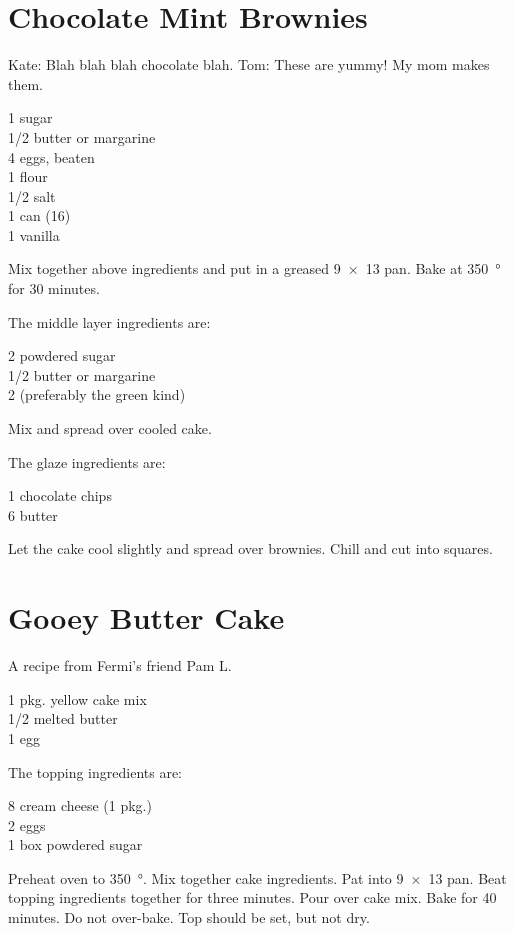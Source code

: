 \section{Chocolate Mint Brownies}

\begin{open}
  Kate: Blah blah blah chocolate blah.  Tom: These are yummy!  My mom makes
  them.
\end{open}
\begin{ingredients}
  \SI{1}{\cup} sugar\\
  \SI{1/2}{\cup} butter or margarine\\
  4 eggs, beaten\\
  \SI{1}{\cup} flour\\
  \SI{1/2}{\teaspoon} salt\\
  1 can  (\SI{16}{\ounce})\\
  \SI{1}{\teaspoon} vanilla
\end{ingredients}
Mix together above ingredients and put in a greased \SI{9x13}{\inch} pan.
Bake at \SI{350}{\degree} for 30 minutes.

The middle layer ingredients are:
\begin{ingredients}
  \SI{2}{\cup} powdered sugar\\
  \SI{1/2}{\cup} butter or margarine\\
  \SI{2}{\tblspoon}  (preferably the green kind)
\end{ingredients}
Mix and spread over cooled cake.

The glaze ingredients are:
\begin{ingredients}
  \SI{1}{\cup} chocolate chips\\
  \SI{6}{\tblspoon} butter
\end{ingredients}
Let the cake cool slightly and spread over brownies.  Chill and cut into
squares.

\section{Gooey Butter Cake}

\begin{open}
  A recipe from Fermi's friend Pam L.
\end{open}
\begin{ingredients}
  1 pkg. yellow cake mix\\
  \SI{1/2}{\cup} melted butter\\
  1 egg
\end{ingredients}
The topping ingredients are:
\begin{ingredients}
  \SI{8}{\ounce} cream cheese (1 pkg.)\\
  2 eggs\\
  1 box powdered sugar
\end{ingredients}
Preheat oven to \SI{350}{\degree}.  Mix together cake ingredients.  Pat into
\SI{9x13}{\inch} pan.  Beat topping ingredients together for three minutes.
Pour over cake mix.  Bake for 40 minutes.  Do not over-bake. Top should be
set, but not dry.

